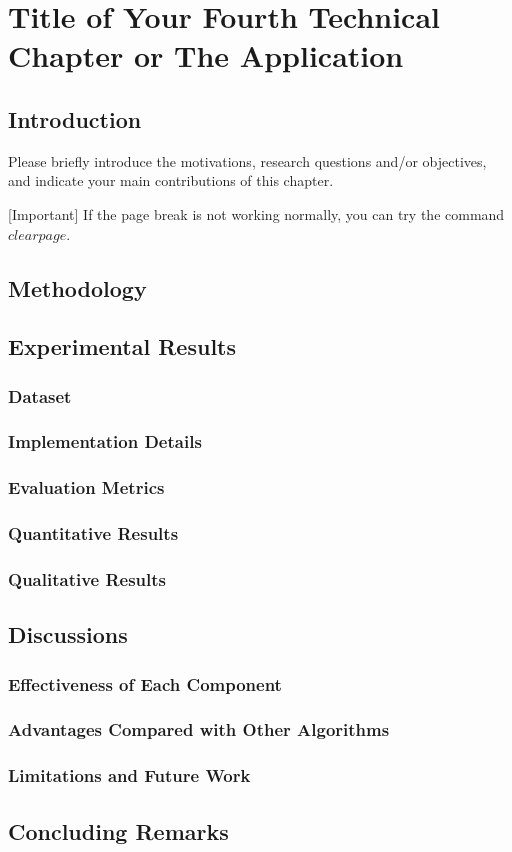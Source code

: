 \chapter{Title of Your Fourth Technical Chapter or The Application}
\label{chap:chapter_6}

\section{Introduction}


Please briefly introduce the motivations, research questions and/or objectives, and indicate your main contributions of this chapter.

[Important] If the page break is not working normally, you can try the command $clearpage$.

\clearpage

\section{Methodology}

\section{Experimental Results}

\subsection{Dataset}
\subsection{Implementation Details}
\subsection{Evaluation Metrics}
\subsection{Quantitative Results}
\subsection{Qualitative Results}


\section{Discussions}
\subsection{Effectiveness of Each Component}
\subsection{Advantages Compared with Other Algorithms}

\subsection{Limitations and Future Work}

\section{Concluding Remarks}


